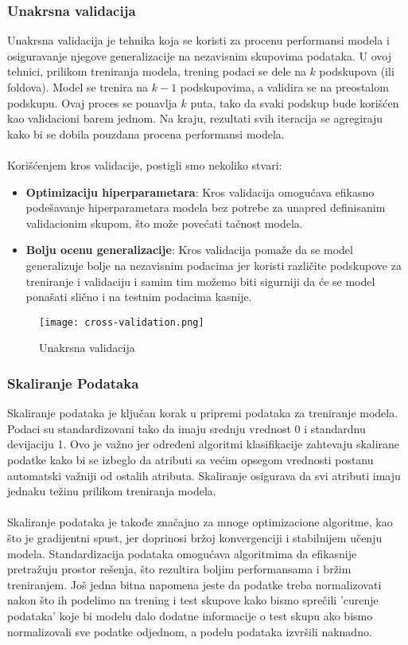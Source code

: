 \documentclass[a4paper,12pt]{article}
\begin{document}
\subsubsection{Unakrsna validacija}
Unakrsna validacija je tehnika koja se koristi za procenu performansi modela i osiguravanje njegove generalizacije na nezavisnim skupovima podataka. U ovoj tehnici, prilikom treniranja modela, trening podaci se dele na $k$ podskupova (ili foldova). Model se trenira na $k-1$ podskupovima, a validira se na preostalom podskupu. Ovaj proces se ponavlja $k$ puta, tako da svaki podskup bude korišćen kao validacioni barem jednom. Na kraju, rezultati svih iteracija se agregiraju kako bi se dobila pouzdana procena performansi modela.\\\\
Korišćenjem kros validacije, postigli smo nekoliko stvari:
\begin{itemize}
    \item \textbf{Optimizaciju hiperparametara}: Kros validacija omogućava efikasno podešavanje hiperparametara modela bez potrebe za unapred definisanim validacionim skupom, što može povećati tačnost modela.
    \item \textbf{Bolju ocenu generalizacije}: Kros validacija pomaže da se model generalizuje bolje na nezavisnim podacima jer koristi različite podskupove za treniranje i validaciju i samim tim možemo biti sigurniji da će se model ponašati slično i na testnim podacima kasnije.
\end{itemize}

\begin{figure}[H]
\centering
\texttt{[image: cross-validation.png]}
\caption{Unakrsna validacija}
\label{fig:cross_validation}
\end{figure}

\subsubsection{Skaliranje Podataka}
Skaliranje podataka je ključan korak u pripremi podataka za treniranje modela. Podaci su standardizovani tako da imaju srednju vrednost 0 i standardnu devijaciju 1. Ovo je važno jer određeni algoritmi klasifikacije zahtevaju skalirane podatke kako bi se izbeglo da atributi sa većim opsegom vrednosti postanu automatski važniji od ostalih atributa. Skaliranje osigurava da svi atributi imaju jednaku težinu prilikom treniranja modela.\\\\
Skaliranje podataka je takođe značajno za mnoge optimizacione algoritme, kao što je gradijentni spust, jer doprinosi bržoj konvergenciji i stabilnijem učenju modela. Standardizacija podataka omogućava algoritmima da efikasnije pretražuju prostor rešenja, što rezultira boljim performansama i bržim treniranjem.
Još jedna bitna napomena jeste da podatke treba normalizovati nakon što ih podelimo na trening i test skupove kako bismo sprečili 'curenje podataka' koje bi modelu dalo dodatne informacije o test skupu ako bismo normalizovali sve podatke odjednom, a podelu podataka izvršili naknadno.
\end{document}
